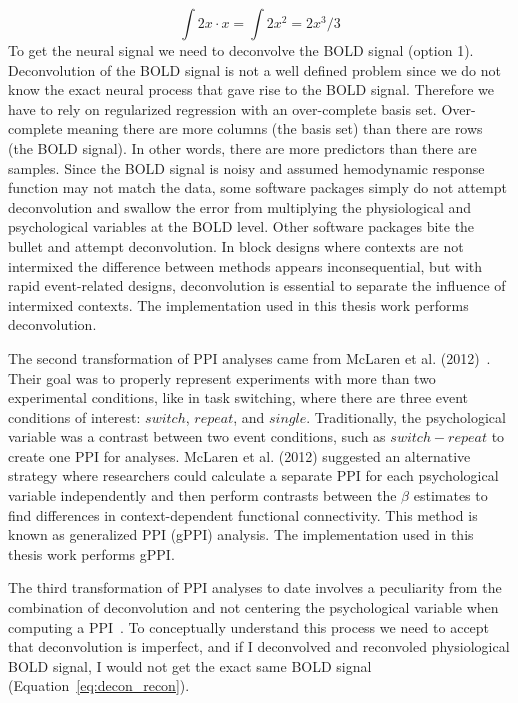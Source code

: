 \documentclass[phd,appendix,figures]{uithesis}
\begin{document}
\begin{equation}
   \int 2x \cdot x = \int 2x^2 = 2x^3 / 3
  \label{eq:familiar_int2}
\end{equation}
To get the neural signal we need to deconvolve the BOLD signal (option 1).
Deconvolution of the BOLD signal is not a well defined problem since
we do not know the exact neural process that gave rise to the BOLD signal.
Therefore we have to rely on regularized regression with an over-complete
basis set.
Over-complete meaning there are more columns (the basis set) than there
are rows (the BOLD signal).
In other words, there are more predictors than there are samples.
Since the BOLD signal is noisy and assumed hemodynamic response function
may not match the data, some software packages simply do not attempt
deconvolution and swallow the error from multiplying the physiological and psychological
variables at the BOLD level.
Other software packages bite the bullet and attempt deconvolution.
In block designs where contexts are not intermixed the difference between
methods appears inconsequential, but with rapid event-related designs,
deconvolution is essential to separate the influence of intermixed contexts.
The implementation used in this thesis work performs deconvolution.

The second transformation of PPI analyses came from McLaren et al. (2012)~\cite{McLaren2012}.
Their goal was to properly represent experiments with more than two experimental conditions, like
in task switching, where there are three event conditions of interest: $switch$, $repeat$, and $single$.
Traditionally, the psychological variable was a contrast between two event conditions, such as
$switch - repeat$ to create one PPI for analyses.
McLaren et al. (2012) suggested an alternative strategy where researchers could
calculate a separate PPI for each psychological variable independently and then
perform contrasts between the $\beta$ estimates to find differences in context-dependent functional connectivity.
This method is known as generalized PPI (gPPI) analysis.
The implementation used in this thesis work performs gPPI.

The third transformation of PPI analyses to date involves a peculiarity from the combination of
deconvolution and not centering the psychological variable when computing a PPI~\cite{Di2017}.
To conceptually understand this process we need to accept that deconvolution is imperfect, and if I
deconvolved and reconvoled physiological BOLD signal,
I would not get the exact same BOLD signal (Equation~\ref{eq:decon_recon}).
\end{document}
